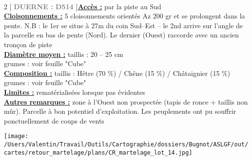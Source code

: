 \documentclass[a4paper,openany]{book}\usepackage[]{graphicx}\usepackage[]{color}
\begin{document}
\\\begin{multicols}{2}
[
\textbf{\textcolor{gray}{
\large DUERNE : D514
}}
]\noindent\textbf{\underline{Accès :}} par la piste au Sud\vspace{0.1cm} \\\noindent\textbf{\underline{Cloisonnements :}} 5 cloisonnements orientés Az 200 gr et se prolongent dans la pente. N.B : le 1er se situe à 27m du coin Sud--Est -- le 2nd arrive sur l'angle de la parcelle en bas de pente (Nord). Le dernier (Ouest) raccorde avec un ancien tronçon de piste\vspace{0.1cm} \\\noindent\textbf{\underline{Diamètre moyen :}} taillis : 20 -- 25 cm \\ grumes : voir feuille "Cube"\vspace{0.1cm} \\\noindent\textbf{\underline{Composition :}} taillis : Hêtre (70 \%) / Chêne (15 \%) / Châtaignier (15 \%) \\ grumes : voir feuille "Cube"\vspace{0.1cm} \\\noindent\textbf{\underline{Limites :}} rematérialisées lorsque pas évidentes\vspace{0.1cm} \\\noindent\textbf{\underline{Autres remarques :}} zone à l'Ouest non prospectée (tapis de ronce + taillis non mûr). Parcelle à bon potentiel d'exploitation. Les peuplements ont pu souffrir ponctuellement de coups de vents\vspace{0.1cm} \\\end{multicols}\begin{center}
\texttt{[image: /Users/Valentin/Travail/Outils/Cartographie/dossiers/Bugnot/ASLGF/out/cartes/retour\_martelage/plans/CR\_martelage\_lot\_14.jpg]}
\end{center}\newpage\noindent
\end{document}
